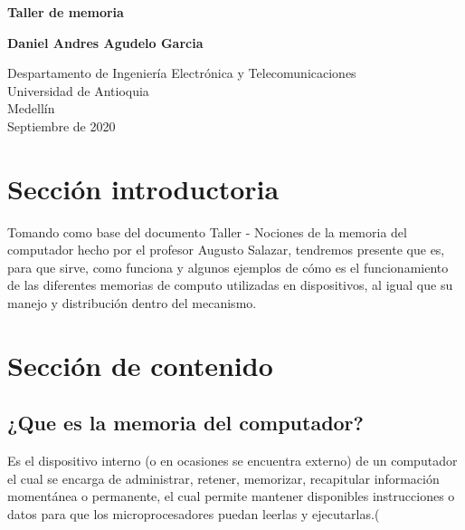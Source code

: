 \documentclass{article}
\begin{document}
\begin{titlepage}
    \begin{center}
        \vspace*{1cm}
            
        \Huge
        \textbf{Taller de memoria}
            
        \vspace{0.5cm}
        \LARGE
            
        \vspace{1.5cm}
            
        \textbf{Daniel Andres Agudelo Garcia}
            
        \vfill
            
        \vspace{0.8cm}
            
        \Large
        Despartamento de Ingeniería Electrónica y Telecomunicaciones\\
        Universidad de Antioquia\\
        Medellín\\
        Septiembre de 2020
            
    \end{center}
\end{titlepage}

\tableofcontents

\vspace{13cm}

\section{Sección introductoria}
Tomando como base del documento Taller - Nociones de la memoria del computador hecho por el profesor Augusto Salazar, tendremos presente que es, para que sirve, como funciona y algunos ejemplos de  cómo es el funcionamiento de las diferentes memorias de computo utilizadas en dispositivos, al igual que su manejo y distribución dentro del mecanismo. \cite{profe}

\vspace{14cm}

\section{Sección de contenido} \label{contenido}
\subsection{¿Que es la memoria del computador?}
Es el dispositivo interno (o en ocasiones se encuentra externo) de un computador el cual se encarga de administrar, retener, memorizar, recapitular información momentánea o permanente, el cual permite mantener disponibles instrucciones o datos para que los microprocesadores puedan leerlas y ejecutarlas.(
\end{document}

